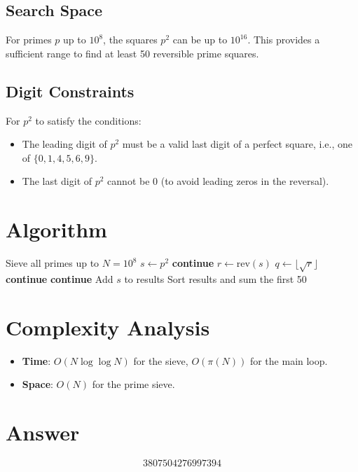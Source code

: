 \documentclass[12pt]{article}
\theoremstyle{definition}
\begin{document}
\subsection{Search Space}

For primes $p$ up to $10^8$, the squares $p^2$ can be up to $10^{16}$. This provides a sufficient range to find at least 50 reversible prime squares.

\subsection{Digit Constraints}

For $p^2$ to satisfy the conditions:
\begin{itemize}
    \item The leading digit of $p^2$ must be a valid last digit of a perfect square, i.e., one of $\{0, 1, 4, 5, 6, 9\}$.
    \item The last digit of $p^2$ cannot be 0 (to avoid leading zeros in the reversal).
\end{itemize}

\section{Algorithm}

\begin{algorithmic}[1]
\State Sieve all primes up to $N = 10^8$
    \State $s \gets p^2$
     \textbf{continue} \EndIf
    \State $r \gets \mathrm{rev}(s)$
    \State $q \gets \lfloor\sqrt{r}\rfloor$
     \textbf{continue} \EndIf
     \textbf{continue} \EndIf
    \State Add $s$ to results
\EndFor
\State Sort results and sum the first 50
\end{algorithmic}

\section{Complexity Analysis}

\begin{itemize}
    \item \textbf{Time}: $O(N \log \log N)$ for the sieve, $O(\pi(N))$ for the main loop.
    \item \textbf{Space}: $O(N)$ for the prime sieve.
\end{itemize}

\section{Answer}

\[
\boxed{3807504276997394}
\]
\end{document}
